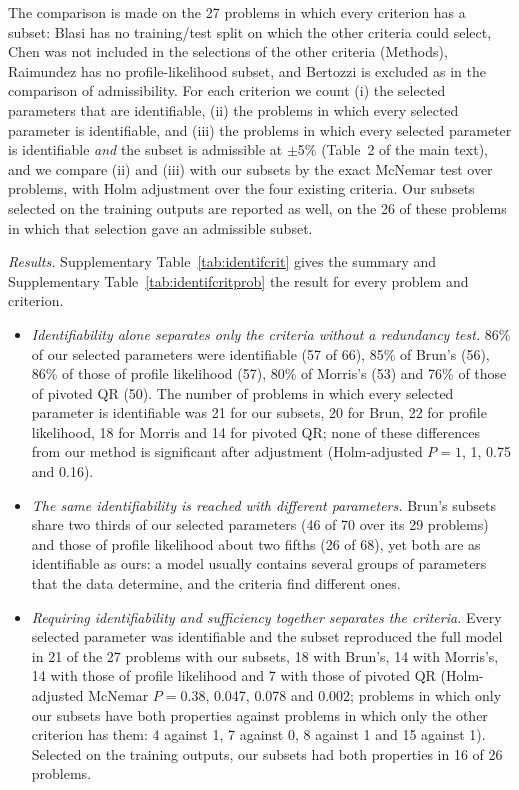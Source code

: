 The comparison is made on the 27 problems in which every criterion has a subset: Blasi has no training/test split on which the other criteria could select, Chen was not included in the selections of the other criteria (Methods), Raimundez has no profile-likelihood subset, and Bertozzi is excluded as in the comparison of admissibility. For each criterion we count (i) the selected parameters that are identifiable, (ii) the problems in which every selected parameter is identifiable, and (iii) the problems in which every selected parameter is identifiable \emph{and} the subset is admissible at $\pm$5\% (Table~2 of the main text), and we compare (ii) and (iii) with our subsets by the exact McNemar test over problems, with Holm adjustment over the four existing criteria. Our subsets selected on the training outputs are reported as well, on the 26 of these problems in which that selection gave an admissible subset.

\emph{Results.} Supplementary Table~\ref{tab:identifcrit} gives the summary and Supplementary Table~\ref{tab:identifcritprob} the result for every problem and criterion.

\begin{itemize}\itemsep0pt
\item \emph{Identifiability alone separates only the criteria without a redundancy test.} 86\% of our selected parameters were identifiable (57 of 66), 85\% of Brun's (56), 86\% of those of profile likelihood (57), 80\% of Morris's (53) and 76\% of those of pivoted QR (50). The number of problems in which every selected parameter is identifiable was 21 for our subsets, 20 for Brun, 22 for profile likelihood, 18 for Morris and 14 for pivoted QR; none of these differences from our method is significant after adjustment (Holm-adjusted $P=1$, 1, 0.75 and 0.16).
\item \emph{The same identifiability is reached with different parameters.} Brun's subsets share two thirds of our selected parameters (46 of 70 over its 29 problems) and those of profile likelihood about two fifths (26 of 68), yet both are as identifiable as ours: a model usually contains several groups of parameters that the data determine, and the criteria find different ones.
\item \emph{Requiring identifiability and sufficiency together separates the criteria.} Every selected parameter was identifiable and the subset reproduced the full model in 21 of the 27 problems with our subsets, 18 with Brun's, 14 with Morris's, 14 with those of profile likelihood and 7 with those of pivoted QR (Holm-adjusted McNemar $P=0.38$, 0.047, 0.078 and 0.002; problems in which only our subsets have both properties against problems in which only the other criterion has them: 4 against 1, 7 against 0, 8 against 1 and 15 against 1). Selected on the training outputs, our subsets had both properties in 16 of 26 problems.
\end{itemize}

